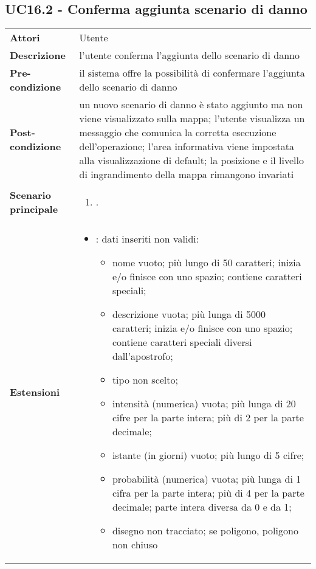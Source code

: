 \subsection{UC16.2 - Conferma aggiunta scenario di danno} 
\label{sssec:UC16.2} 
\def\arraystretch{1.5}
\begin{tabularx}{\textwidth}{l|p{}}
	\rowcolor{I} \multicolumn{2}{c}{\color{white}\textbf{UC16.2 - Conferma aggiunta scenario di danno}} \\
	\toprule
	\endhead
	\textbf{Attori} & Utente\\
	\textbf{Descrizione} & l'utente conferma l'aggiunta dello scenario di danno\\
	\textbf{Pre-condizione} & il sistema offre la possibilità di confermare l'aggiunta dello scenario di danno\\
	\textbf{Post-condizione} & un nuovo scenario di danno è stato aggiunto ma non viene visualizzato sulla mappa; l'utente visualizza un messaggio che comunica la corretta esecuzione dell'operazione; l'area informativa viene impostata alla visualizzazione di default; la posizione e il livello di ingrandimento della mappa rimangono invariati\\
	\textbf{Scenario principale} & \vspace{-1.2em}\begin{enumerate}[leftmargin=*,noitemsep,nosep]
		\item \nameref{sssec:UC16.2}.
	\end{enumerate}\\
	\textbf{Estensioni} & \vspace{-1.2em}\begin{itemize}[leftmargin=*,noitemsep,nosep]
		\item \nameref{sssec:UC16.3}: dati inseriti non validi:
		\begin{itemize}
			\item nome vuoto; più lungo di 50 caratteri; inizia e/o
			finisce con uno spazio; contiene caratteri speciali;
			\item descrizione vuota; più lunga di 5000 caratteri;
			inizia e/o finisce con uno spazio; contiene
			caratteri speciali diversi dall'apostrofo;
			\item tipo non scelto;
			\item intensità (numerica) vuota; più lunga di 20 cifre per la
			parte intera; più di 2 per la parte decimale;
			\item istante (in giorni) vuoto; più lungo di 5 cifre;
			\item probabilità (numerica) vuota; più lunga di 1 cifra per la
			parte intera; più di 4 per la parte decimale; parte
			intera diversa da 0 e da 1;
			\item disegno non tracciato; se poligono, poligono non
			chiuso
		\end{itemize}
	\end{itemize}\\
	\bottomrule
\end{tabularx}
